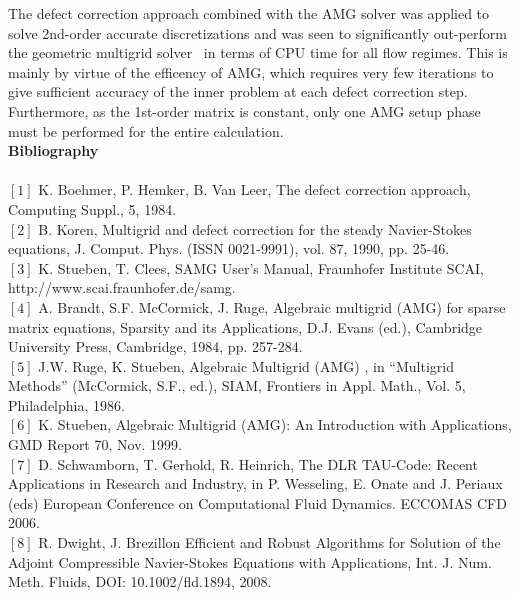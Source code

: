 \documentclass{report}
\begin{document}
The defect correction approach combined with the AMG solver was applied
to solve 2nd-order accurate
discretizations and was seen to significantly out-perform the geometric
multigrid solver~\cite{TAU, TAU_lin}
in terms of CPU time for all flow regimes. This is mainly by virtue of
the efficency of AMG, which requires
very few iterations to give sufficient accuracy of the inner problem at
each defect correction step.
Furthermore, as the 1st-order matrix is constant, only one AMG setup
phase must be performed for
the entire calculation.
~\\{\Large \bf Bibliography} \\~\\
$[1]$ K. Boehmer, P. Hemker, B. Van Leer, The defect correction approach,
Computing Suppl., 5,
1984. \\[0.8ex]
$[2]$ B. Koren, Multigrid and defect correction for the steady
Navier-Stokes equations, J. Comput.
Phys. (ISSN 0021-9991), vol. 87, 1990, pp. 25-46. \\[0.8ex]
$[3]$ K. Stueben, T. Clees, SAMG User’s Manual, Fraunhofer Institute SCAI, \\
http://www.scai.fraunhofer.de/samg. \\[0.8ex]
$[4]$ A. Brandt, S.F. McCormick, J. Ruge, Algebraic multigrid (AMG) for
sparse matrix equations,
Sparsity and its Applications, D.J. Evans (ed.), Cambridge University
Press, Cambridge, 1984,
pp. 257-284. \\[0.8ex]
$[5]$ J.W. Ruge, K. Stueben, Algebraic Multigrid (AMG) , in “Multigrid
Methods” (McCormick,
S.F., ed.), SIAM, Frontiers in Appl. Math., Vol. 5, Philadelphia, 1986. \\[0.8ex]
$[6]$ K. Stueben, Algebraic Multigrid (AMG): An Introduction with
Applications, GMD Report 70,
Nov. 1999. \\[0.8ex]
$[7]$ D. Schwamborn, T. Gerhold, R. Heinrich, The DLR TAU-Code: Recent Applications in
Research and Industry, in P. Wesseling, E. Onate and J. Periaux (eds) European Conference
on Computational Fluid Dynamics. ECCOMAS CFD 2006. \\[0.8ex]
$[8]$ R. Dwight, J. Brezillon Efficient and Robust Algorithms for Solution of the Adjoint
Compressible Navier-Stokes Equations with Applications, Int. J. Num. Meth. Fluids, DOI:
10.1002/fld.1894, 2008.
\end{document}
